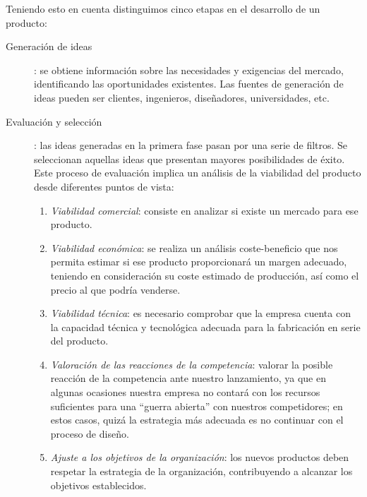 \documentclass[10pt,a4paper,spanish]{report}
\begin{document}
                        Teniendo esto en cuenta distinguimos cinco etapas en el desarrollo de un producto:
                        \begin{description}
                              \item[Generación de ideas]: se obtiene información sobre las necesidades y exigencias del mercado, identificando las oportunidades existentes. Las fuentes de generación de ideas pueden ser clientes, ingenieros, diseñadores, universidades, etc.

                              \item[Evaluación y selección]: las ideas generadas en la primera fase pasan por una serie de filtros. Se seleccionan aquellas ideas que presentan mayores posibilidades de éxito. Este proceso de evaluación implica un análisis de la viabilidad del producto desde diferentes puntos de vista:
                              \begin{enumerate}[---]
                                    \item \textit{\textcolor[rgb]{0.9,0.7,0.6}{Viabilidad comercial}}: consiste en analizar si existe un mercado para ese producto.
                                    \item \textit{\textcolor[rgb]{0.9,0.7,0.6}{Viabilidad económica}}: se realiza un análisis coste-beneficio que nos permita estimar si ese producto proporcionará un margen adecuado, teniendo en consideración su coste estimado de producción, así como el precio  al que podría venderse.
                                    \item \textit{\textcolor[rgb]{0.9,0.7,0.6}{Viabilidad técnica}}: es necesario comprobar que la empresa cuenta con la capacidad técnica y tecnológica adecuada para la fabricación en serie del producto.
                                    \item \textit{\textcolor[rgb]{0.9,0.7,0.6}{Valoración de las reacciones de la competencia}}: valorar la posible reacción de la competencia ante nuestro lanzamiento, ya que en algunas ocasiones nuestra empresa no contará con los recursos suficientes para una ``guerra abierta'' con nuestros competidores; en estos casos, quizá la estrategia más adecuada es no continuar con el proceso de diseño.
                                    \item \textit{\textcolor[rgb]{0.9,0.7,0.6}{Ajuste a los objetivos de la organización}}: los nuevos productos deben respetar la estrategia de la organización, contribuyendo a alcanzar los objetivos establecidos.
                              \end{enumerate}

\end{description}
\end{document}
